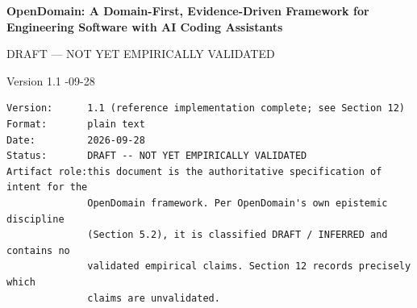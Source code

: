 \documentclass[11pt,a4paper]{article}
\begin{document}
\begin{center}
{\LARGE\bfseries OpenDomain: A Domain-First, Evidence-Driven Framework for Engineering Software with AI Coding Assistants\par}
\vspace{0.6em}
{\large DRAFT --- NOT YET EMPIRICALLY VALIDATED\par}
\vspace{0.4em}
{\normalsize Version 1.1 \quad\textperiodcentered{}-09-28\par}
\end{center}

\begin{Verbatim}[fontsize=\footnotesize,breaklines=true,breakanywhere=true]
Version:      1.1 (reference implementation complete; see Section 12)
Format:       plain text
Date:         2026-09-28
Status:       DRAFT -- NOT YET EMPIRICALLY VALIDATED
Artifact role:this document is the authoritative specification of intent for the
              OpenDomain framework. Per OpenDomain's own epistemic discipline
              (Section 5.2), it is classified DRAFT / INFERRED and contains no
              validated empirical claims. Section 12 records precisely which
              claims are unvalidated.
\end{Verbatim}
\end{document}
